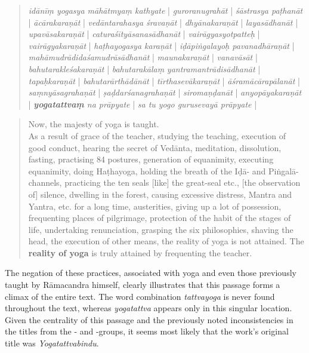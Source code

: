 \begin{quote}
  \label{mahatmya}
  \textit{idānīṃ yogasya māhātmyaṃ kathyate} |
  \textit{guroranugrahāt} | \textit{śāstrasya paṭhanāt} | \textit{ācārakaraṇāt} | \textit{vedāntarahasya śravaṇāt} |
  \textit{dhyānakaraṇāt} | \textit{layasādhanāt} | \textit{upavāsakaraṇāt} | \textit{caturaśītyāsanasādhanāt} | \textit{vairāgyasyotpatteḥ} | \textit{vairāgyakaraṇāt} | \textit{haṭhayogasya karaṇāt} | \textit{iḍāpiṅgalayoḥ pavanadhāraṇāt} | \textit{mahāmudrādidaśamudrāsādhanāt} | \textit{maunakaraṇāt} | \textit{vanavāsāt} | \textit{bahutarakleśakaraṇāt} | \textit{bahutarakālaṃ} \textit{yantramantrādisādhanāt} | \textit{tapaḥkaraṇāt} | \textit{bahutarārthādānāt} | \textit{tīrthasevākaraṇāt} | \textit{āśramācārapālanāt} | \textit{saṃnyāsagrahaṇāt} | \textit{ṣaḍdarśanagrahaṇāt} | \textit{siromaṇḍanāt} | \textit{anyopāyakaraṇāt} | \textit{\textbf{yogatattvaṃ} na prāpyate} | \textit{sa tu yogo gurusevayā prāpyate} |
\end{quote}

\begin{quote}
  Now, the majesty of yoga is taught.\\
  As a result of grace of the teacher, studying the teaching, execution of good conduct, hearing the secret of Vedānta, meditation, dissolution, fasting, practising 84 postures, generation of equanimity, executing equanimity, doing Haṭhayoga, holding the breath of the Iḍā- and Piṅgalā-channels,  practicing the ten seals [like] the great-seal etc., [the observation of] silence, dwelling in the forest, causing excessive distress, Mantra and Yantra, etc. for a long time, austerities, giving up a lot of possession, frequenting places of pilgrimage, protection of the habit of the stages of life, undertaking renunciation, grasping the six philosophies, shaving the head, the execution of other means, the reality of yoga is not attained. The \textbf{reality of yoga} is truly attained by frequenting the teacher.
  \end{quote}

The negation of these practices, associated with yoga and even those previously taught by Rāmacandra himself, clearly illustrates that this passage forms a climax of the entire text. The word combination \textit{tattvayoga} is never found throughout the text, whereas \textit{yogatattva} appears only in this singular location. Given the centrality of this passage and the previously noted inconsistencies in the titles from the \alpha- and \beta-groups, it seems most likely that the work's original title was \emph{Yogatattvabindu}.

